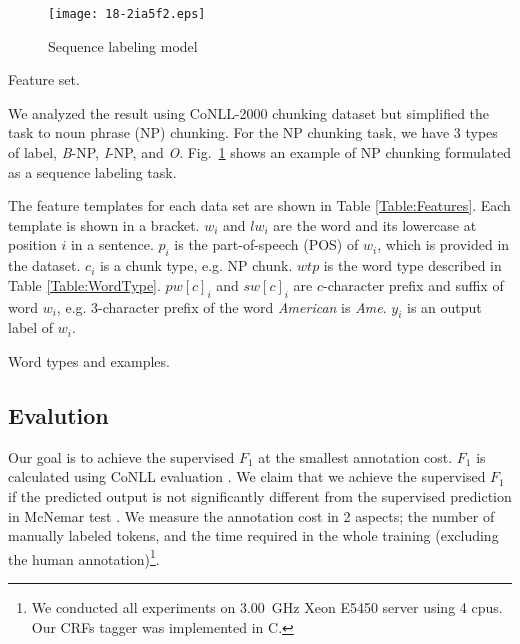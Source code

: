 \documentclass[english]{jnlp_JS2.0}
\begin{document}
\begin{figure}[b]
\begin{center}
\texttt{[image: 18-2ia5f2.eps]}
\end{center}
\caption{Sequence labeling model}
\label{Fig:SequenceLabeling}
\vspace{1\baselineskip}
\end{figure}
\begin{table}[b]
\caption{Feature set.}
\label{Table:Features}

\end{table}

We analyzed the result using CoNLL-2000 chunking dataset but simplified the task to noun phrase (NP) chunking. For the NP chunking task, we have 3 types of label, \textit{B}-NP, \textit{I}-NP, and \textit{O}. Fig.~\ref{Fig:SequenceLabeling} shows an example of NP chunking formulated as a sequence labeling task.

The feature templates for each data set are shown in Table \ref{Table:Features}. Each template is shown in a bracket. $w_i$ and $lw_i$ are the word and its lowercase at position $i$ in a sentence. $p_i$ is the part-of-speech (POS) of $w_i$, which is provided in the dataset. $c_i$ is a chunk type, e.g. NP chunk. $wtp$ is the word type described in Table \ref{Table:WordType}. $pw[c]_i$ and $sw[c]_i$ are $c$-character prefix and suffix of word $w_i$, e.g. 3-character prefix of the word \textit{American} is \textit{Ame}. $y_i$ is an output label of $w_i$. 

\begin{table}[t]
	\caption{Word types and examples.}
	\label{Table:WordType}

\end{table}



\subsection{Evalution}

Our goal is to achieve the supervised $F_1$ at the smallest annotation cost. $F_1$ is calculated using CoNLL evaluation \cite{CoNLL2000}. We claim that we achieve the supervised $F_1$ if the predicted output is not significantly different from the supervised prediction in McNemar test \cite{McNemarTest}. We measure the annotation cost in 2 aspects; the number of manually labeled tokens, and the time required in the whole training (excluding the human annotation)\footnote{We conducted all experiments on 3.00~GHz Xeon E5450 server using 4 cpus. Our CRFs tagger was implemented in C.}.
\end{document}
